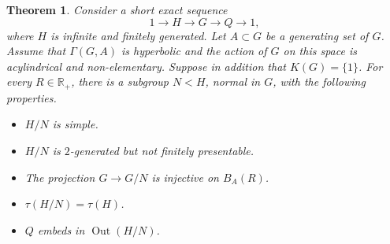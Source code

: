 \documentclass[JEP,XML,SOM,Unicode]{cedram}
\newtheorem{theorem}{Theorem}[section]
\theoremstyle{definition}
\newcommand{\Out}{\operatorname{Out}}
\begin{document}
\begin{theorem}
\label{thm:general}
Consider a short exact sequence
\begin{equation*}
1 \to H \to G \to Q \to 1,
\end{equation*}
where $H$ is infinite and finitely generated.
Let $A \subset G$ be a generating set of $G$.
Assume that $\Gamma(G,A)$ is hyperbolic and the action of $G$ on this space is acylindrical and non-elementary.
Suppose in addition that $K(G) = \{1\}$.
For every $R \in \mathbb R_+$, there is a subgroup $N < H$, normal in $G$, with the following properties.
\begin{itemize}
\item $H/N$ is simple.
\item $H/N$ is $2$-generated but not finitely presentable.
\item The projection $G \to G/N$ is injective on $B_A(R)$.
\item $\tau(H/N) = \tau(H)$.
\item $Q$ embeds in $\Out(H/N)$.
\end{itemize}
\end{theorem}
\end{document}
